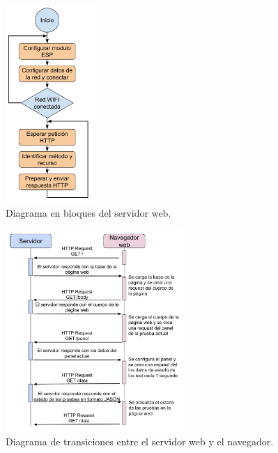 \begin{figure}[H]
	\centering
	\includegraphics[width=0.3\textwidth]{./Figures/BloquesServidor.pdf}
	\caption{Diagrama en bloques del servidor web.}
	\label{fig:BloquesServidor}
\end{figure}

\begin{figure}[H]
	\centering
	\includegraphics[width=0.6\textwidth]{./Figures/TransaccionesHTTP.pdf}
	\caption{Diagrama de transiciones entre el servidor web y el navegador.}
	\label{fig:TransaccionesHTTP}
\end{figure}

